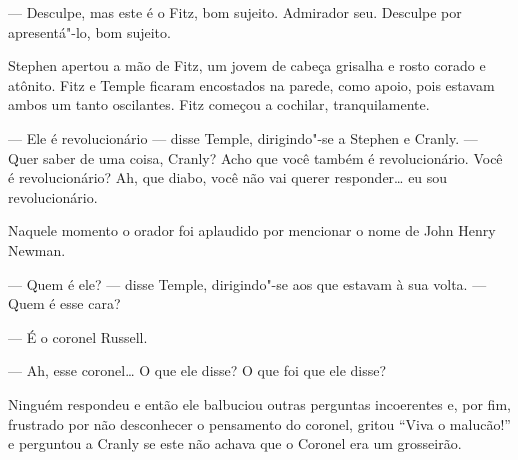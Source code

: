 --- Desculpe, mas este é o Fitz, bom sujeito.  Admirador seu.  Desculpe por
apresentá"-lo, bom sujeito.

Stephen apertou a mão de Fitz, um jovem de cabeça grisalha e rosto corado e
atônito.  Fitz e Temple ficaram encostados na parede, como apoio, pois estavam
ambos um tanto oscilantes.  Fitz começou a cochilar, tranquilamente.

--- Ele é revolucionário --- disse Temple, dirigindo"-se a Stephen e Cranly.
--- Quer saber de uma coisa, Cranly?  Acho que você também é revolucionário.
Você é revolucionário?  Ah, que diabo, você não vai querer responder\ldots{} eu sou
revolucionário.

Naquele momento o orador foi aplaudido por mencionar o nome de John Henry
Newman.

--- Quem é ele? --- disse Temple, dirigindo"-se aos que estavam à sua volta.
--- Quem é esse cara?

--- É o coronel Russell.

--- Ah, esse coronel\ldots{}  O que ele disse?  O que foi que ele disse?

Ninguém respondeu e então ele balbuciou outras perguntas incoerentes e, por
fim, frustrado por não desconhecer o pensamento do coronel, gritou “Viva o
malucão!” e perguntou a Cranly se este não achava que o Coronel era um
grosseirão.

